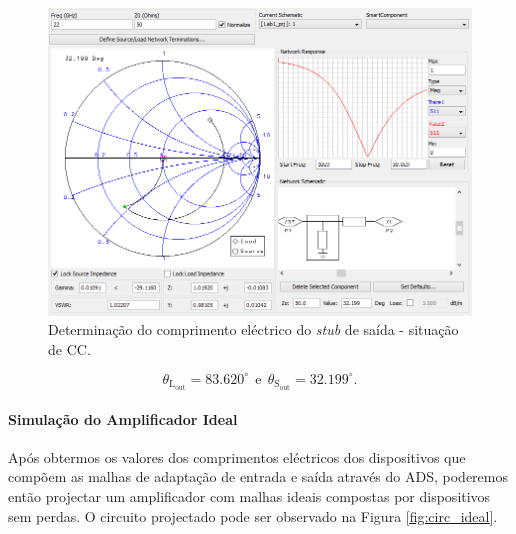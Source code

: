 \documentclass[11pt]{article}
\numberwithin{equation}{section}
\begin{document}
\begin{figure}[H]
	\centering
	\includegraphics[keepaspectratio=true, scale=0.45]{exps/Carga_CC_stub}
	\vspace{-0.5em}
	\caption{Determinação do comprimento eléctrico do \textit{stub} de saída - situação de CC.}
	\vspace{-0.8em}
\end{figure}

\vspace{-3mm}
\begin{equation}
\theta_{\text{L}_{\text{out}}} = 83.620^{\circ}  ~~ \text{e} ~~ \theta_{\text{S}_{\text{out}}} = 32.199^{\circ}.
\end{equation}

\vspace{1mm} 

\paragraph{Simulação do Amplificador Ideal} \hspace{0pt}  

Após obtermos os valores dos comprimentos eléctricos dos dispositivos que compõem as malhas de adaptação de entrada e saída através do ADS, poderemos então projectar um amplificador com malhas ideais compostas por dispositivos sem perdas. O circuito projectado pode ser observado na Figura \ref{fig:circ_ideal}.
\end{document}
